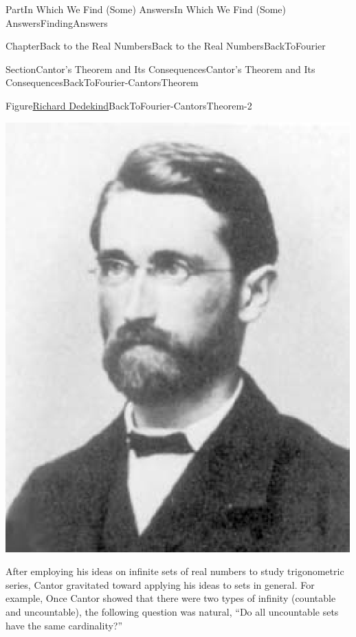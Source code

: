 \documentclass[oneside,10pt,]{book}
\numberwithin{equation}{part}
\begin{document}
\begin{partptx}{Part}{In Which We Find (Some) Answers}{}{In Which We Find (Some) Answers}{}{}{FindingAnswers}
\begin{chapterptx}{Chapter}{Back to the Real Numbers}{}{Back to the Real Numbers}{}{}{BackToFourier}
%
\begin{sectionptx}{Section}{Cantor's Theorem and Its Consequences}{}{Cantor's Theorem and Its Consequences}{}{}{BackToFourier-CantorsTheorem}
\begin{figureptx}{Figure}{\href{https://mathshistory.st-andrews.ac.uk/Biographies/Dedekind/}{Richard Dedekind}\protect\footnotemark{}}{BackToFourier-CantorsTheorem-2}{}%
%
\begin{image}{0.325}{0.35}{0.325}{}%
\includegraphics[width=\linewidth]{external/images/Dedekind.png}
\end{image}%
\tcblower
\end{figureptx}%
%
After employing his ideas on infinite sets of real numbers to study trigonometric series, Cantor gravitated toward applying his ideas to sets in general.  For example, Once Cantor showed that there were two types of infinity (countable and uncountable), the following question was natural, ``Do all uncountable sets have the same cardinality?''%

\end{sectionptx}
\end{chapterptx}
\end{partptx}
\end{document}

